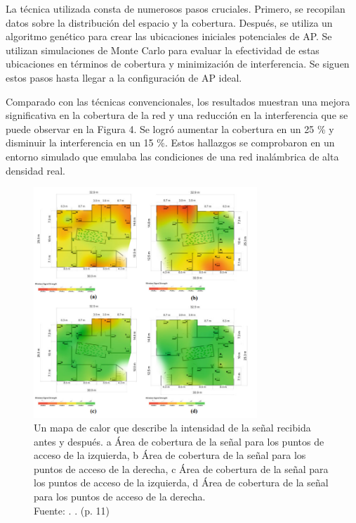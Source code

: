 La técnica utilizada consta de numerosos pasos cruciales. Primero, se recopilan datos sobre la distribución del espacio y la cobertura. Después, se utiliza un algoritmo genético para crear las ubicaciones iniciales potenciales de AP. Se utilizan simulaciones de Monte Carlo para evaluar la efectividad de estas ubicaciones en términos de cobertura y minimización de interferencia. Se siguen estos pasos hasta llegar a la configuración de AP ideal.

Comparado con las técnicas convencionales, los resultados muestran una mejora significativa en la cobertura de la red y una reducción en la interferencia que se puede observar en la Figura 4. Se logró aumentar la cobertura en un 25 \% y disminuir la interferencia en un 15 \%. Estos hallazgos se comprobaron en un entorno simulado que emulaba las condiciones de una red inalámbrica de alta densidad real.

\begin{figure}[!ht]
	\begin{center}
		\includegraphics[width=0.75\textwidth]{2/figures/alathari2023.png}
		\caption[Un mapa de calor que describe la intensidad de la señal recibida antes y después. a Área de cobertura de la señal para los puntos de acceso de la izquierda, b Área de cobertura de la señal para los puntos de acceso de la derecha, c Área de cobertura de la señal para los puntos de acceso de la izquierda, d Área de cobertura de la señal para los puntos de acceso de la derecha.]{Un mapa de calor que describe la intensidad de la señal recibida antes y después. a Área de cobertura de la señal para los puntos de acceso de la izquierda, b Área de cobertura de la señal para los puntos de acceso de la derecha, c Área de cobertura de la señal para los puntos de acceso de la izquierda, d Área de cobertura de la señal para los puntos de acceso de la derecha.\\
		Fuente: \cite{pr_alathari2023optaps}. . (p. 11)}
		\label{2:fig112}
	\end{center}
\end{figure}

